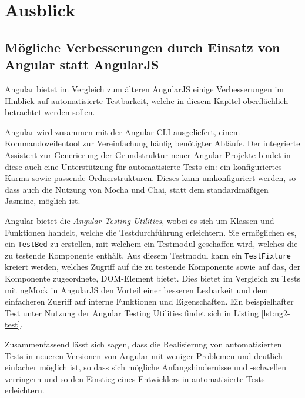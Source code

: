 \section{Ausblick}
\subsection{Mögliche Verbesserungen durch Einsatz von Angular statt AngularJS}
Angular bietet im Vergleich zum älteren AngularJS einige Verbesserungen im Hinblick auf automatisierte Testbarkeit, welche in diesem Kapitel oberflächlich betrachtet werden sollen.

Angular wird zusammen mit der Angular CLI ausgeliefert, einem Kommandozeilentool zur Vereinfachung häufig benötigter Abläufe. Der integrierte Assistent zur Generierung der Grundstruktur neuer Angular-Projekte bindet in diese auch eine Unterstützung für automatisierte Tests ein: ein konfiguriertes Karma sowie passende Ordnerstrukturen. Dieses kann umkonfiguriert werden, so dass auch die Nutzung von Mocha und Chai, statt dem standardmäßigen Jasmine, möglich ist. \cite{ng2-cli}

Angular bietet die \textit{Angular Testing Utilities}, wobei es sich um Klassen und Funktionen handelt, welche die Testdurchführung erleichtern. Sie ermöglichen es, ein \texttt{TestBed} zu erstellen, mit welchem ein Testmodul geschaffen wird, welches die zu testende Komponente enthält. Aus diesem Testmodul kann ein \texttt{TestFixture} kreiert werden, welches Zugriff auf die zu testende Komponente sowie auf das, der Komponente zugeordnete, DOM-Element bietet. Dies bietet im Vergleich zu Tests mit ngMock in AngularJS den Vorteil einer besseren Lesbarkeit und dem einfacheren Zugriff auf interne Funktionen und Eigenschaften. Ein beispielhafter Test unter Nutzung der Angular Testing Utilities findet sich in Listing \ref{lst:ng2-test}.  \cite{ng2-test}

Zusammenfassend lässt sich sagen, dass die Realisierung von automatisierten Tests in neueren Versionen von Angular mit weniger Problemen und deutlich einfacher möglich ist, so dass sich mögliche Anfangshindernisse und -schwellen verringern und so den Einstieg eines Entwicklers in automatisierte Tests erleichtern. 

\begin{figure}[H]
	
\end{figure}

